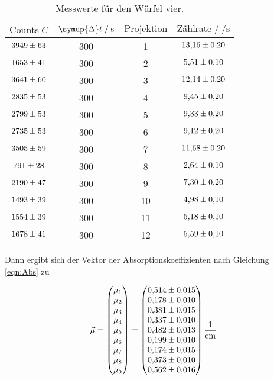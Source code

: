 \begin{table}[H]
  \centering
  \small
  \caption{Messwerte für den Würfel vier.}
  \label{tab:mess6}
  \begin{tabular}{c c c c}
  \toprule
  $\text{Counts} \; C$ & $\symup{\Delta} t \;/\; \si{\second}$ & $\text{Projektion}$ & $\text{Zählrate} \;/\; \si{\per\second}$\\
  \midrule
      $\num{3949+-63}$ & 300 & 1 & $\num{13.16+-0.2}$\\
      $\num{1653+-41}$ & 300 & 2 & $\num{5.51+-0.1}$\\
      $\num{3641+-60}$ & 300 & 3 & $\num{12.14+-0.2}$\\
      $\num{2835+-53}$ & 300 & 4 & $\num{9.45+-0.2}$\\
      $\num{2799+-53}$ & 300 & 5 & $\num{9.33+-0.2}$\\
      $\num{2735+-53}$ & 300 & 6 & $\num{9.12+-0.2}$\\
      $\num{3505+-59}$ & 300 & 7 & $\num{11.68+-0.2}$\\
      $\num{791+-28}$ & 300 & 8 & $\num{2.64+-0.1}$\\
      $\num{2190+-47}$ & 300 & 9 & $\num{7.30+-0.2}$\\
      $\num{1493+-39}$ & 300 & 10 & $\num{4.98+-0.1}$\\
      $\num{1554+-39}$ & 300 & 11 & $\num{5.18+-0.1}$\\
      $\num{1678+-41}$ & 300 & 12 & $\num{5.59+-0.1}$\\
  \bottomrule
  \end{tabular}
\end{table}

Dann ergibt sich der Vektor der Absorptionskoeffizienten nach Gleichung \eqref{eqn:Abs} zu 

\begin{equation*}
  \vec{\mu} = 
    \begin{pmatrix}
      \mu_1\\
      \mu_2\\
      \mu_3\\
      \mu_4\\
      \mu_5\\
      \mu_6\\
      \mu_7\\
      \mu_8\\
      \mu_9\\
    \end{pmatrix}
    = 
    \begin{pmatrix}
      \num{0.514+-0.015}\\
      \num{0.178+-0.010}\\
      \num{0.381+-0.015}\\
      \num{0.337+-0.010}\\
      \num{0.482+-0.013}\\
      \num{0.199+-0.010}\\
      \num{0.174+-0.015}\\
      \num{0.373+-0.010}\\
      \num{0.562+-0.016}\\
    \end{pmatrix}
    \si{\per\centi\metre}
\end{equation*}

